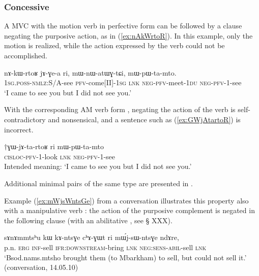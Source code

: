\subsubsection{Concessive} \label{sec:am.concessive}
A MVC  with the motion verb in perfective form can be followed by a clause negating the purposive action, as in (\ref{ex:nAkWrtoR}). In this example, only the motion is realized, while the action expressed by the verb  could not be accomplished.

\begin{exe}
\ex \label{ex:nAkWrtoR}
\gll nɤ-kɯ-rtoʁ jɤ-ɣe-a ri, mɯ-nɯ-atɯɣ-tɕi, mɯ-pɯ-ta-mto. \\
\textsc{1sg.poss}-\textsc{nmlz}:S/A-see \textsc{pfv}-come[II]-\textsc{1sg} \textsc{lnk} \textsc{neg}-\textsc{pfv}-meet-\textsc{1du} \textsc{neg}-\textsc{pfv}-1-see \\
\glt `I came to see you but I did not see you.' 
\end{exe}

With the corresponding AM verb form , negating the action of the verb is self-contradictory and nonsensical, and a sentence such as (\ref{ex:GWjAtartoR}) is incorrect.

\begin{exe}
\ex \label{ex:GWjAtartoR}
\gll $\dagger$ɣɯ-jɤ-ta-rtoʁ ri mɯ-pɯ-ta-mto \\
\textsc{cisloc}-\textsc{pfv}-1-look \textsc{lnk} \textsc{neg}-\textsc{pfv}-1-see \\
\glt Intended meaning: `I came to see you but I did not see you.' 
\end{exe}

Additional minimal pairs of the same type are presented in \citet[202-203]{jacques13harmonization}.

Example (\ref{ex:mWjsWntsGe}) from a conversation illustrates this property also with a manipulative verb : the action of the purposive complement   is negated in the following clause (with an abilitative , see § XXX).

 \begin{exe}
\ex \label{ex:mWjsWntsGe}
 \gll   sɤnɤmmtsʰu kɯ kɤ-ntsɣe cʰɤ-ɣɯt ri mɯ́j-sɯ-ntsɣe ndɤre, \\
 p.n. \textsc{erg} \textsc{inf}-sell \textsc{ifr}:\textsc{downstream}-bring \textsc{lnk} \textsc{neg}:\textsc{sens}-\textsc{abil}-sell \textsc{lnk} \\
\glt `Bsod.nams.mtsho brought them (to Mbarkham) to sell, but could not sell it.' (conversation, 14.05.10)
 \end{exe}

